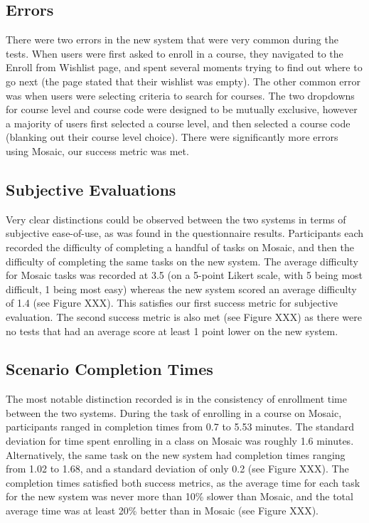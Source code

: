 \documentclass[10pt]{article}
\begin{document}
\begin{multicols}{2}
\subsection*{Errors}
There were two errors in the new system that were very common during the tests. When users were first asked to enroll in a course, they navigated to the Enroll from Wishlist page, and spent several moments trying to find out where to go next (the page stated that their wishlist was empty). The other common error was when users were selecting criteria to search for courses. The two dropdowns for course level and course code were designed to be mutually exclusive, however a majority of users first selected a course level, and then selected a course code (blanking out their course level choice). There were significantly more errors using Mosaic, our success metric was met.

\subsection*{Subjective Evaluations}
Very clear distinctions could be observed between the two systems in terms of subjective ease-of-use, as was found in the questionnaire results. Participants each recorded the difficulty of completing a handful of tasks on Mosaic, and then the difficulty of completing the same tasks on the new system. The average difficulty for Mosaic tasks was recorded at 3.5 (on a 5-point Likert scale, with 5 being most difficult, 1 being most easy) whereas the new system scored an average difficulty of 1.4 (see Figure XXX). This satisfies our first success metric for subjective evaluation. The second success metric is also met (see Figure XXX) as there were no tests that had an average score at least 1 point lower on the new system.

\subsection*{Scenario Completion Times}
The most notable distinction recorded is in the consistency of enrollment time between the two systems. During the task of enrolling in a course on Mosaic, participants ranged in completion times from 0.7 to 5.53 minutes. The standard deviation for time spent enrolling in a class on Mosaic was roughly 1.6 minutes. Alternatively, the same task on the new system had completion times ranging from 1.02 to 1.68, and a standard deviation of only 0.2 (see Figure XXX). The completion times satisfied both success metrics, as the average time for each task for the new system was never more than 10\% slower than Mosaic, and the total average time was at least 20\% better than in Mosaic (see Figure XXX).\\


\end{multicols}
\end{document}
